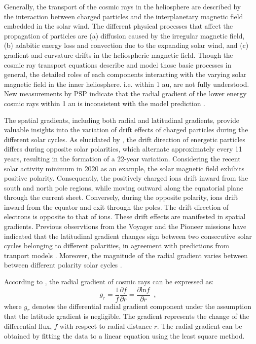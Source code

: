 Generally, the transport of the cosmic rays in the heliosphere are described by the interaction between charged particles and the interplanetary magnetic field embedded in the solar wind. The different physical processes that affect the propagation of particles are (a) diffusion caused by the irregular magnetic field, (b) adabitic energy loss and convection due to the expanding solar wind, and (c) gradient and curvature drifts in the heliospheric magnetic field.
Though the cosmic ray transport equations describe and model those basic processes \citep{Parker1965Pss,Jokipii1977ApJ,Jokipii1981ApJ,McDonald2001ICRC} in general, the detailed roles of each components interacting with the varying solar magnetic field in the inner heliosphere. i.e. within 1 au, are not fully understood. New measurements by \ac{PSP} indicate that the radial gradient of the lower energy cosmic rays within 1 au is inconsistent with the model prediction \citep{Rankin2021ApJ}.

The spatial gradients, including both radial and latitudinal gradients, provide valuable insights into the variation of drift effects of charged particles during the different solar cycles. As elucidated by \citet{Jokipii1977ApJ, Jokipii1979ApJ, Potgieter2013LRSP}, the drift direction of energetic particles differs during opposite solar polarities, which alternate approximately every 11 years, resulting in the formation of a 22-year variation. Considering the recent solar activity minimum in 2020 as an example, the solar magnetic field exhibits positive polarity. Consequently, the positively charged ions drift inward from the south and north pole regions, while moving outward along the equatorial plane through the current sheet. Conversely, during the opposite polarity, ions drift inward from the equator and exit through the poles. The drift direction of electrons is opposite to that of ions. These drift effects are manifested in spatial gradients. Previous observtions from the Voyager and the Pioneer missions have indicated that the latitudinal gradient changes sign between two consecutive solar cycles belonging to different polarities, in agreement with predictions from tranport models \citep{Mckibben1979ApJ, Cummings1987GeoRL, Christon1986JGR}. Moreover, the magnitude of the radial gradient varies between between different polarity solar cycles \citep{Rankin2021ApJ,Rankin2022ApJ,Giacalone2022SSRv,Webber1981JGR,Marsden1999AdSpR}.

According to \citet{Rankin2021ApJ}, the radial gradient of cosmic rays can be expressed as:
\begin{equation}
    g_r = \frac{1}{f}\frac{\partial{f}}{\partial{r}} = \frac{\partial{\mathrm{ln} f}}{\partial{r}} \enspace ,
    \label{eq:radial_gradient}
\end{equation}
where $g_r$ denotes the differential radial gradient component under the assumption that the latitude gradient is negligible. The gradient represents the change of the differential flux, $f$ with respect to radial distance $r$. The radial gradient can be obtained by fitting the data to a linear equation using the least square method.


